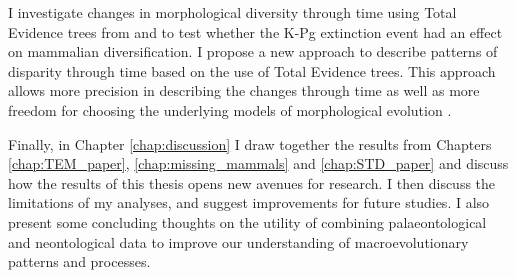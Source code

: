 I investigate changes in morphological diversity \citep[or disparity;][]{Wills1994} through time using Total Evidence trees from \cite{Slater2012MEE} and \cite{beckancient2014} to test whether the K-Pg extinction event had an effect on mammalian diversification.
I propose a new approach to describe patterns of disparity through time based on the use of Total Evidence trees.
This approach allows more precision in describing the changes through time as well as more freedom for choosing the underlying models of morphological evolution \citep[e.g. punctuated or gradual;][]{Hunt21042015}.

Finally, in Chapter \ref{chap:discussion} I draw together the results from Chapters \ref{chap:TEM_paper}, \ref{chap:missing_mammals} and \ref{chap:STD_paper} and discuss how the results of this thesis opens new avenues for research.
I then discuss the limitations of my analyses, and suggest improvements for future studies.
I also present some concluding thoughts on the utility of combining palaeontological and neontological data to improve our understanding of macroevolutionary patterns and processes.

%